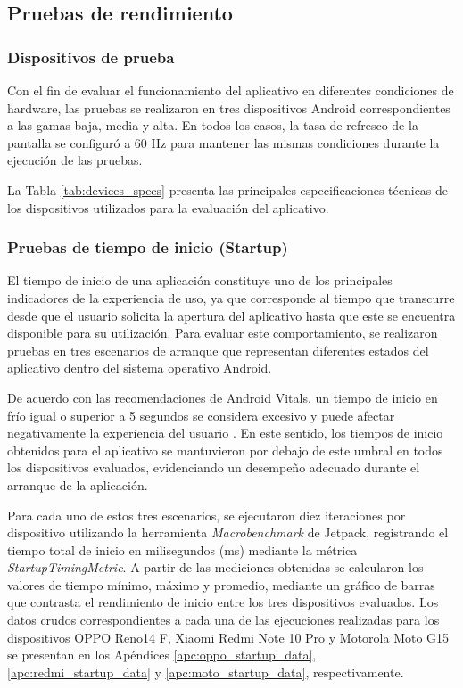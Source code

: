             

    \subsection{Pruebas de rendimiento}

        \subsubsection{Dispositivos de prueba}

            Con el fin de evaluar el funcionamiento del aplicativo en diferentes condiciones de hardware, las pruebas se realizaron en tres dispositivos Android correspondientes a las gamas baja, media y alta. En todos los casos, la tasa de refresco de la pantalla se configuró a 60 Hz para mantener las mismas condiciones durante la ejecución de las pruebas.

            La Tabla \ref{tab:devices_specs} presenta las principales especificaciones técnicas de los dispositivos utilizados para la evaluación del aplicativo.

            

        \subsubsection{Pruebas de tiempo de inicio (Startup)}

            El tiempo de inicio de una aplicación constituye uno de los principales indicadores de la experiencia de uso, ya que corresponde al tiempo que transcurre desde que el usuario solicita la apertura del aplicativo hasta que este se encuentra disponible para su utilización. Para evaluar este comportamiento, se realizaron pruebas en tres escenarios de arranque que representan diferentes estados del aplicativo dentro del sistema operativo Android.

            De acuerdo con las recomendaciones de Android Vitals, un tiempo de inicio en frío igual o superior a 5 segundos se considera excesivo y puede afectar negativamente la experiencia del usuario \parencite{GOOGLEVITALS:2026}. En este sentido, los tiempos de inicio obtenidos para el aplicativo se mantuvieron por debajo de este umbral en todos los dispositivos evaluados, evidenciando un desempeño adecuado durante el arranque de la aplicación.

            Para cada uno de estos tres escenarios, se ejecutaron diez iteraciones por dispositivo utilizando la herramienta \textit{Macrobenchmark} de Jetpack, registrando el tiempo total de inicio en milisegundos (ms) mediante la métrica \textit{StartupTimingMetric}. A partir de las mediciones obtenidas se calcularon los valores de tiempo mínimo, máximo y promedio, mediante un gráfico de barras que contrasta el rendimiento de inicio entre los tres dispositivos evaluados. Los datos crudos correspondientes a cada una de las ejecuciones realizadas para los dispositivos OPPO Reno14 F, Xiaomi Redmi Note 10 Pro y Motorola Moto G15 se presentan en los Apéndices \ref{apc:oppo_startup_data}, \ref{apc:redmi_startup_data} y \ref{apc:moto_startup_data}, respectivamente.


